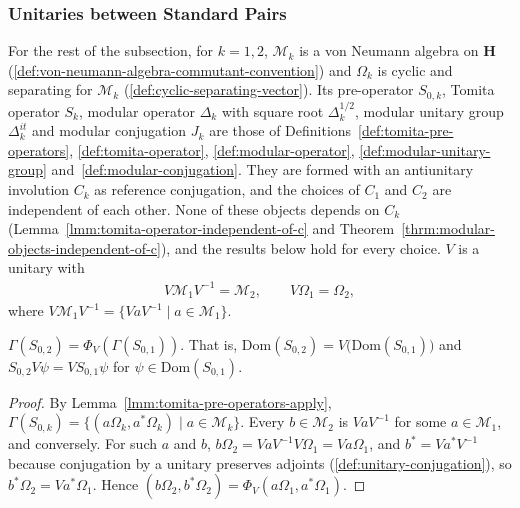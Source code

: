 \subsubsection{Unitaries between Standard Pairs}

For the rest of the subsection, for $k = 1, 2$, $\mathcal{M}_k$ is a von Neumann algebra on $\mathbf{H}$ (\ref{def:von-neumann-algebra-commutant-convention}) and $\Omega_k$ is cyclic and separating for $\mathcal{M}_k$ (\ref{def:cyclic-separating-vector}). Its pre-operator $S_{0,k}$, Tomita operator $S_k$, modular operator $\Delta_k$ with square root $\Delta_k^{1/2}$, modular unitary group $\Delta_k^{it}$ and modular conjugation $J_k$ are those of Definitions~\ref{def:tomita-pre-operators}, \ref{def:tomita-operator}, \ref{def:modular-operator}, \ref{def:modular-unitary-group} and~\ref{def:modular-conjugation}. They are formed with an antiunitary involution $C_k$ as reference conjugation, and the choices of $C_1$ and $C_2$ are independent of each other. None of these objects depends on $C_k$ (Lemma~\ref{lmm:tomita-operator-independent-of-c} and Theorem~\ref{thrm:modular-objects-independent-of-c}), and the results below hold for every choice. $V$ is a unitary with
\begin{align}
    V\mathcal{M}_1V^{-1} = \mathcal{M}_2, \qquad V\Omega_1 = \Omega_2,
\end{align}
where $V\mathcal{M}_1V^{-1} = \{ VaV^{-1} \mid a \in \mathcal{M}_1 \}$.

\begin{lemma}
    \label{lmm:unitary-intertwines-tomita-pre-operators}
    \leanok
    $\Gamma(S_{0,2}) = \Phi_V(\Gamma(S_{0,1}))$. That is, $\text{Dom}(S_{0,2}) = V\big(\text{Dom}(S_{0,1})\big)$ and $S_{0,2}V\psi = VS_{0,1}\psi$ for $\psi \in \text{Dom}(S_{0,1})$.
\end{lemma}
\begin{proof}
    \leanok
    By Lemma~\ref{lmm:tomita-pre-operators-apply}, $\Gamma(S_{0,k}) = \{ (a\Omega_k, a^*\Omega_k) \mid a \in \mathcal{M}_k \}$. Every $b \in \mathcal{M}_2$ is $VaV^{-1}$ for some $a \in \mathcal{M}_1$, and conversely. For such $a$ and $b$, $b\Omega_2 = VaV^{-1}V\Omega_1 = Va\Omega_1$, and $b^* = Va^*V^{-1}$ because conjugation by a unitary preserves adjoints (\ref{def:unitary-conjugation}), so $b^*\Omega_2 = Va^*\Omega_1$. Hence $(b\Omega_2, b^*\Omega_2) = \Phi_V(a\Omega_1, a^*\Omega_1)$.
\end{proof}

